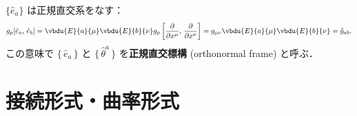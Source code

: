 \documentclass[geometry_main]{subfiles}
\begin{document}
$\bigl\{ \hat{e}_a \bigr\}$ は正規直交系をなす：
\begin{align} 
	g_p[\hat{e}_a,\, \hat{e}_b] = \vbdu{E}{a}{\mu} \vbdu{E}{b}{\nu} g_p \left[ \pdv{}{x^{\mu}},\, \pdv{}{x^{\nu}} \right] = g_{\mu\nu} \vbdu{E}{a}{\mu} \vbdu{E}{b}{\nu} = \mathring{g}_{ab}.
\end{align}
この意味で $\{\, \hat{e}_a\, \}$ と $\{\, \hat{\theta}^a\, \}$ を\textbf{正規直交標構} (orthonormal frame) と呼ぶ．

\section{接続形式・曲率形式}




\end{document}
